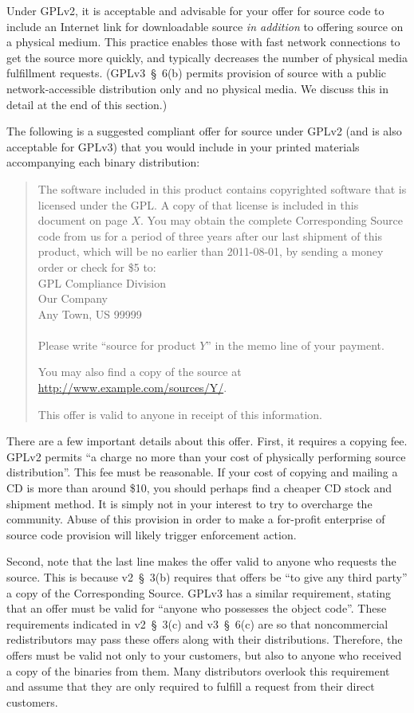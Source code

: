 \label{offer-with-internet}

Under GPLv2, it is acceptable and advisable for your offer for source code
to include an Internet link for downloadable source \emph{in addition} to
offering source on a physical medium.  This practice enables those with
fast network connections to get the source more quickly, and typically
decreases the number of physical media fulfillment requests.
(GPLv3~\S~6(b) permits provision of source with a public
network-accessible distribution only and no physical media.  We discuss
this in detail at the end of this section.)

The following is a suggested compliant offer for source under GPLv2 (and
is also acceptable for GPLv3) that you would include in your printed
materials accompanying each binary distribution:

\begin{quote}
The software included in this product contains copyrighted software that
is licensed under the GPL\@.  A copy of that license is included in this
document on page $X$\@.  You may obtain the complete Corresponding Source
code from us for a period of three years after our last shipment of this
product, which will be no earlier than 2011-08-01, by sending a money
order or check for \$5 to: \\
GPL Compliance Division \\
Our Company \\
Any Town, US 99999 \\
\\
Please write ``source for product $Y$'' in the memo line of your
payment.

You may also find a copy of the source at
\url{http://www.example.com/sources/Y/}.

This offer is valid to anyone in receipt of this information.
\end{quote}

There are a few important details about this offer.  First, it requires a
copying fee.  GPLv2 permits ``a charge no more than your cost of
physically performing source distribution''.  This fee must be reasonable.
If your cost of copying and mailing a CD is more than around \$10, you
should perhaps find a cheaper CD stock and shipment method.  It is simply
not in your interest to try to overcharge the community.  Abuse of this
provision in order to make a for-profit enterprise of source code
provision will likely trigger enforcement action.

Second, note that the last line makes the offer valid to anyone who
requests the source.  This is because v2~\S~3(b) requires that offers be
``to give any third party'' a copy of the Corresponding Source.  GPLv3 has
a similar requirement, stating that an offer must be valid for ``anyone
who possesses the object code''.  These requirements indicated in
v2~\S~3(c) and v3~\S~6(c) are so that noncommercial redistributors may
pass these offers along with their distributions.  Therefore, the offers
must be valid not only to your customers, but also to anyone who received
a copy of the binaries from them.  Many distributors overlook this
requirement and assume that they are only required to fulfill a request
from their direct customers.


